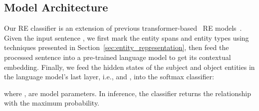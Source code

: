 \documentclass[11pt,a4paper]{article}
\begin{document}
\begin{table*}[!t]
\centering
{}
    \caption{\textbf{Test  (in \%) of different entity representation techniques on TACRED.} For each technique, we also provide the processed input of an example sentence \textit{``Bill was born in Seattle''}. Typed entity marker (original and punct) significantly outperforms others.}
    \label{tab::representation}
\end{table*}

\subsection{Model Architecture}
\label{sec:model_architecture}
Our RE classifier is an extension of previous transformer-based~\cite{devlin-etal-2019-bert,liu2019roberta} RE models~\cite{baldini-soares-etal-2019-matching}.
Given the input sentence , we first mark the entity spans and entity types using techniques presented in Section~\ref{sec:entity_representation}, then feed the processed sentence into a pre-trained language model to get its contextual embedding.
Finally, we feed the hidden states of the subject and object entities in the language model's last layer, i.e.,  and , into the softmax classifier:

where ,  are model parameters.
In inference, the classifier returns the relationship with the maximum probability.
\end{document}
